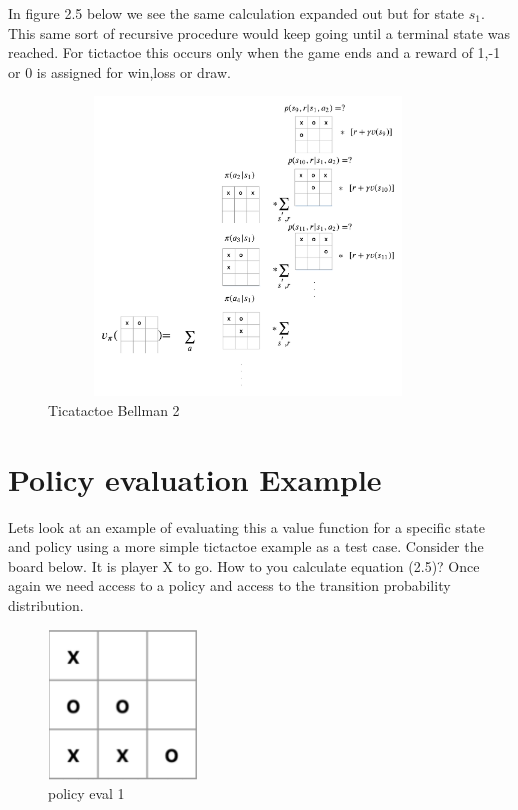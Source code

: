 In figure 2.5 below we see the same calculation expanded out but for state $s_{1}$. This same sort of recursive procedure would keep going until a terminal state was reached. For tictactoe this occurs only when the game ends and a reward of 1,-1 or 0 is assigned for win,loss or draw. 

\begin{figure}[H]
        \centering
        \includegraphics[width=400px,height=300px]{images/PolicyEvaluationExample/intractable_value_function_2.png}
        \caption{Ticatactoe Bellman 2}
        \label{fig:my_label}
\end{figure}

\section{Policy evaluation Example}

Lets look at an example of evaluating this a value function for a specific state and policy using a more simple tictactoe example as a test case. Consider the board below. It is player X to go. How to you calculate equation (2.5)? Once again we need access to a policy and access to the transition probability distribution. 

\begin{figure}[H]
        \centering
        \includegraphics[width=150px,height=150px]{images/PolicyEvaluationExample/pe_example_s0.png}
        \caption{policy eval 1}
        \label{fig:my_label}
\end{figure}

